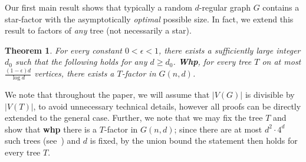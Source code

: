\documentclass[notitlepage]{scrartcl}
\newtheorem{theorem}{Theorem}
\begin{document}
Our first main result shows that typically a random $d$-regular graph $G$ contains a star-factor with the asymptotically \textit{optimal} possible size. In fact, we extend this result to factors of \textit{any} tree (not necessarily a star).

\begin{theorem}\label{th: main}
For every constant $0< \epsilon<1$, there exists a sufficiently large integer $d_0$ such that the following holds for any $d\ge d_0$. \textbf{Whp}, for every tree $T$ on at most $\frac{(1-\epsilon) d}{\log d}$ vertices, there exists a $T$-factor in $G(n,d)$.
\end{theorem}
We note that throughout the paper, we will assume that $|V(G)|$ is divisible by $|V(T)|$, to avoid unnecessary technical details, however all proofs can be directly extended to the general case. Further, we note that we may fix the tree $T$ and show that \textbf{whp} there is a $T$-factor in $G(n,d)$; since there are at most $d^2\cdot 4^{d}$ such trees (see~\cite{Otter}) and $d$ is fixed, by the union bound the statement then holds for every tree $T$.
\end{document}
